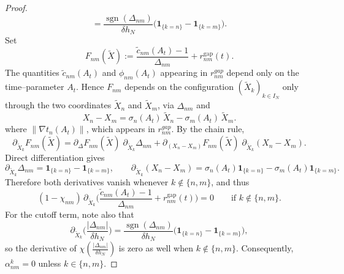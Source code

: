\documentclass[10pt,a4paper]{amsart}
\begin{document}
\begin{proof}
\begin{equation}
=\frac{\operatorname{sgn}(\Delta_{nm})}{\delta h_N}
\big(\mathbf{1}_{\{k=n\}}-\mathbf{1}_{\{k=m\}}\big).
\end{equation}
Set
\begin{equation}
F_{nm}(\widetilde X)
:= \frac{\widetilde c_{nm}(A_t)-1}{\Delta_{nm}}
   + r^{\mathrm{gap}}_{nm}(t).
\end{equation}
The quantities $\widetilde c_{nm}(A_t)$ and $\phi_{nm}(A_t)$ appearing in
$r^{gap}_{nm}$ depend only on the time–parameter $A_t$.
Hence $F_{nm}$ depends on the configuration $(\widetilde X_k)_{k\in I_N}$
only through the two coordinates $\widetilde X_n$ and $\widetilde X_m$, via
$\Delta_{nm}$ and
\begin{equation}
X_n-X_m=\sigma_n(A_t)\,\widetilde X_n-\sigma_m(A_t)\,\widetilde X_m .
\end{equation}
where $\big\|\nabla t_n(A_t) \big\|$, which appears in $r^{gap}_{nm}$. By the chain rule,
\begin{equation}
\partial_{\widetilde X_k}F_{nm}(\widetilde X)
=\partial_{\Delta}F_{nm}(\widetilde X)\;\partial_{\widetilde X_k}\Delta_{nm}
+\partial_{(X_n-X_m)}F_{nm}(\widetilde X)\;\partial_{\widetilde X_k}(X_n-X_m).
\end{equation}
Direct differentiation gives
\begin{equation}
\partial_{\widetilde X_k}\Delta_{nm}
=\mathbf 1_{\{k=n\}}-\mathbf 1_{\{k=m\}},
\qquad
\partial_{\widetilde X_k}(X_n-X_m)
=\sigma_n(A_t)\mathbf 1_{\{k=n\}}-\sigma_m(A_t)\mathbf 1_{\{k=m\}} .
\end{equation}
Therefore both derivatives vanish whenever $k\notin\{n,m\}$, and thus
\begin{equation}
(1-\chi_{nm})\,\partial_{\widetilde X_k}
\Big(\frac{\widetilde c_{nm}(A_t)-1}{\Delta_{nm}}+r^{\mathrm{gap}}_{nm}(t)\Big)=0
\qquad\text{if }k\notin\{n,m\}.
\end{equation}
For the cutoff term, note also that
\begin{equation}
\partial_{\widetilde X_k}\!\Big(\frac{|\Delta_{nm}|}{\delta h_N}\Big)
=\frac{\operatorname{sgn}(\Delta_{nm})}{\delta h_N}
\big(\mathbf 1_{\{k=n\}}-\mathbf 1_{\{k=m\}}\big),
\end{equation}
so the derivative of $\chi\!\left(\frac{|\Delta_{nm}|}{\delta h_N}\right)$
is zero as well when $k\notin\{n,m\}$. Consequently, $\alpha^k_{nm}=0$
unless $k\in\{n,m\}$.


\end{proof}
\end{document}
